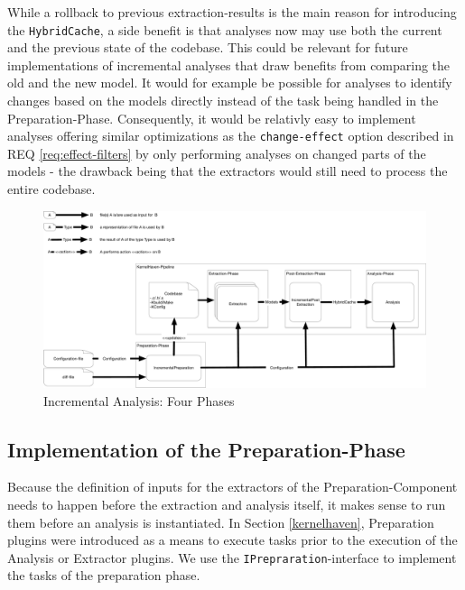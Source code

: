 \documentclass[a4paper]{article}
\begin{document}
While a rollback to previous extraction-results is the main reason for introducing the \texttt{Hybrid\-Cache}, a side benefit is that analyses now may use both the current and the previous state of the codebase. This could be relevant for future implementations of incremental analyses that draw benefits from comparing the old and the new model. It would for example be possible for analyses to identify changes based on the models directly instead of the task being handled in the Preparation-Phase. Consequently, it would be relativly easy to implement analyses offering similar optimizations as the \texttt{change-effect} option described in REQ \ref{req:effect-filters} by only performing analyses on changed parts of the models - the drawback being that the extractors would still need to process the entire codebase.

\clearpage
\begin{figure}[h] 
  \centering
  \begin{minipage}[b]{1\textwidth} 
    \caption[Incremental Analysis: Four Phases]{Incremental Analysis: Four Phases}\label{4-phases}
    \centering
    \includegraphics[width=0.9\textheight, angle=90]{img/KernelHavenIncremental.pdf}
  \end{minipage}
\end{figure}
\clearpage


\subsection{Implementation of the Preparation-Phase}\label{preparation-phase}

Because the definition of inputs for the extractors of the Preparation-Component needs to happen before the extraction and analysis itself, it makes sense to run them before an analysis is instantiated. In Section \ref{kernelhaven}, Preparation plugins were introduced as a means to execute tasks prior to the execution of the Analysis or Extractor plugins. We use the \texttt{IPrepraration}-interface to implement the tasks of the preparation phase.
\end{document}
